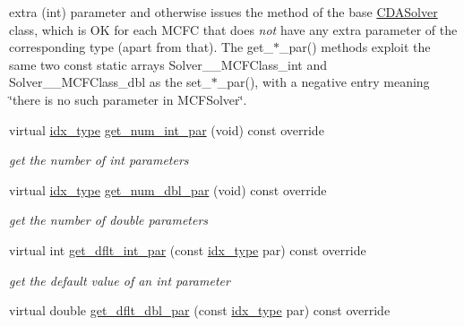 \begin{Indent}
{extra (int) parameter and otherwise issues the method of the base \mbox{\hyperlink{class_s_m_spp__di__unipi__it_1_1_c_d_a_solver}{C\+D\+A\+Solver}} class, which is OK for each M\+C\+FC that does {\itshape not} have any extra parameter of the corresponding type (apart from that). The get\+\_\+$\ast$\+\_\+par() methods exploit the same two const static arrays Solver\+\_\+\_\+\+M\+C\+F\+Class\+\_\+int and Solver\+\_\+\_\+\+M\+C\+F\+Class\+\_\+dbl as the set\+\_\+$\ast$\+\_\+par(), with a negative entry meaning \char`\"{}there is no such parameter in M\+C\+F\+Solver\char`\"{}. }\begin{DoxyCompactItemize}
\item 
virtual \mbox{\hyperlink{class_s_m_spp__di__unipi__it_1_1_thin_compute_interface_aa3d710629ad8c434286726ad810c3b47}{idx\+\_\+type}} \mbox{\hyperlink{class_s_m_spp__di__unipi__it_1_1_m_c_f_solver_a3ad74d9506761eb2ca4c8a936fb7a1c5}{get\+\_\+num\+\_\+int\+\_\+par}} (void) const override
\begin{DoxyCompactList}\small\item\em get the number of int parameters \end{DoxyCompactList}\item 
virtual \mbox{\hyperlink{class_s_m_spp__di__unipi__it_1_1_thin_compute_interface_aa3d710629ad8c434286726ad810c3b47}{idx\+\_\+type}} \mbox{\hyperlink{class_s_m_spp__di__unipi__it_1_1_m_c_f_solver_a842fd454acaded84baf6b77e0d61a950}{get\+\_\+num\+\_\+dbl\+\_\+par}} (void) const override
\begin{DoxyCompactList}\small\item\em get the number of double parameters \end{DoxyCompactList}\item 
virtual int \mbox{\hyperlink{class_s_m_spp__di__unipi__it_1_1_m_c_f_solver_a75dd1491b74c4b9476755e061dce3e04}{get\+\_\+dflt\+\_\+int\+\_\+par}} (const \mbox{\hyperlink{class_s_m_spp__di__unipi__it_1_1_thin_compute_interface_aa3d710629ad8c434286726ad810c3b47}{idx\+\_\+type}} par) const override
\begin{DoxyCompactList}\small\item\em get the default value of an int parameter \end{DoxyCompactList}\item 
virtual double \mbox{\hyperlink{class_s_m_spp__di__unipi__it_1_1_m_c_f_solver_a465a771c115acf8d5f4e32e22f003014}{get\+\_\+dflt\+\_\+dbl\+\_\+par}} (const \mbox{\hyperlink{class_s_m_spp__di__unipi__it_1_1_thin_compute_interface_aa3d710629ad8c434286726ad810c3b47}{idx\+\_\+type}} par) const override

\end{DoxyCompactItemize}
\end{Indent}
